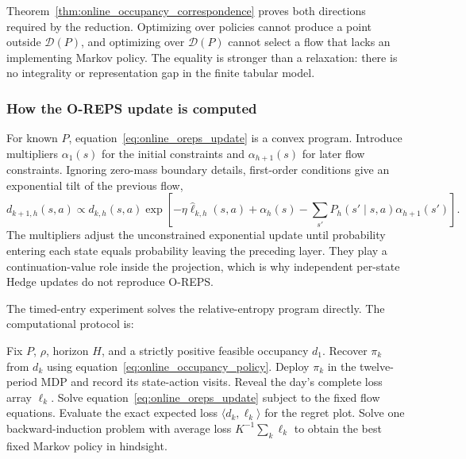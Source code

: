 Theorem~\ref{thm:online_occupancy_correspondence} proves both directions required by the reduction. Optimizing over policies cannot produce a point outside $\mathcal D(P)$, and optimizing over $\mathcal D(P)$ cannot select a flow that lacks an implementing Markov policy. The equality is stronger than a relaxation: there is no integrality or representation gap in the finite tabular model.

\subsubsection{How the O-REPS update is computed}

For known $P$, equation~\eqref{eq:online_oreps_update} is a convex program. Introduce multipliers $\alpha_1(s)$ for the initial constraints and $\alpha_{h+1}(s)$ for later flow constraints. Ignoring zero-mass boundary details, first-order conditions give an exponential tilt of the previous flow,
\begin{equation}
d_{k+1,h}(s,a)
\propto
d_{k,h}(s,a)
\exp\!\left[-\eta\widehat\ell_{k,h}(s,a)
+\alpha_h(s)
-\sum_{s'}P_h(s'\mid s,a)\alpha_{h+1}(s')\right].
\label{eq:online_oreps_tilt}
\end{equation}
The multipliers adjust the unconstrained exponential update until probability entering each state equals probability leaving the preceding layer. They play a continuation-value role inside the projection, which is why independent per-state Hedge updates do not reproduce O-REPS.

The timed-entry experiment solves the relative-entropy program directly. The computational protocol is:
\begin{algorithm}[htbp]
\caption{Known-transition occupancy update used in the timed-entry study}
\label{alg:online_known_occupancy}
\begin{algorithmic}[1]
\State Fix $P$, $\rho$, horizon $H$, and a strictly positive feasible occupancy $d_1$.
\State Recover $\pi_k$ from $d_k$ using equation~\eqref{eq:online_occupancy_policy}.
\State Deploy $\pi_k$ in the twelve-period MDP and record its state-action visits.
\State Reveal the day's complete loss array $\ell_k$.
\State Solve equation~\eqref{eq:online_oreps_update} subject to the fixed flow equations.
\State Evaluate the exact expected loss $\langle d_k,\ell_k\rangle$ for the regret plot.
\EndFor
\State Solve one backward-induction problem with average loss $K^{-1}\sum_k\ell_k$ to obtain the best fixed Markov policy in hindsight.
\end{algorithmic}
\end{algorithm}

